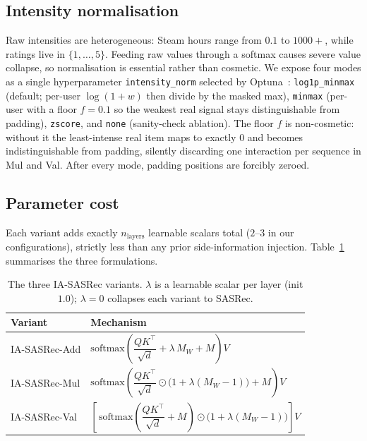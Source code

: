 \subsection{Intensity normalisation}
\label{sec:method:norm}

Raw intensities are heterogeneous: Steam hours range from $0.1$ to
$1000+$, while ratings live in $\{1,\dots,5\}$. Feeding raw values
through a softmax causes severe value collapse, so normalisation is
essential rather than cosmetic. We expose four modes as a single
hyperparameter \texttt{intensity\_norm} selected by Optuna~\citep{akiba2019optuna}:
\texttt{log1p\_minmax} (default; per-user $\log(1+w)$ then divide by
the masked max), \texttt{minmax} (per-user with a floor $f = 0.1$ so
the weakest real signal stays distinguishable from padding),
\texttt{zscore}, and \texttt{none} (sanity-check ablation). The floor
$f$ is non-cosmetic: without it the least-intense real item maps to
exactly $0$ and becomes indistinguishable from padding, silently
discarding one interaction per sequence in Mul and Val. After every
mode, padding positions are forcibly zeroed.

\subsection{Parameter cost}
\label{sec:method:cost}

Each variant adds exactly $n_{\mathrm{layers}}$ learnable scalars
total ($2$--$3$ in our configurations), strictly less than any
prior side-information injection. Table~\ref{tab:variants} summarises
the three formulations.

\begin{table}[t]
\centering
\small
\caption{The three IA-SASRec variants. $\lambda$ is a learnable scalar per layer (init $1.0$); $\lambda = 0$ collapses each variant to SASRec.}
\label{tab:variants}
\begin{tabular}{ll}
\toprule
Variant & Mechanism \\
\midrule
IA-SASRec-Add & $\mathrm{softmax}\!\left(\dfrac{QK^{\top}}{\sqrt{d}} + \lambda\, M_W + M\right)\! V$ \\[1.2em]
IA-SASRec-Mul & $\mathrm{softmax}\!\left(\dfrac{QK^{\top}}{\sqrt{d}} \odot \bigl(1 + \lambda(M_W - 1)\bigr) + M\right)\! V$ \\[1.2em]
IA-SASRec-Val & $\left[\,\mathrm{softmax}\!\left(\dfrac{QK^{\top}}{\sqrt{d}} + M\right) \odot \bigl(1 + \lambda(M_W - 1)\bigr)\right] V$ \\[0.6em]
\bottomrule
\end{tabular}
\end{table}
